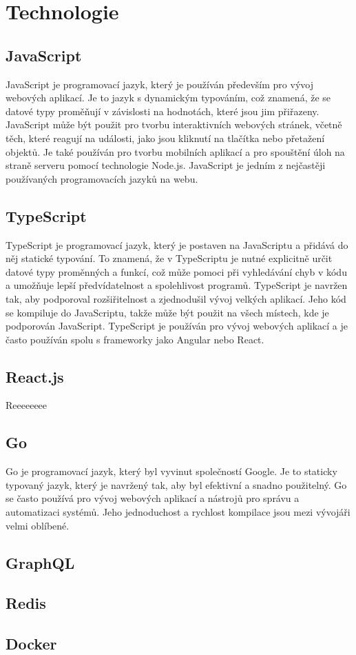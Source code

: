 \section{Technologie}

\subsection{JavaScript}

JavaScript je programovací jazyk, který je používán především pro vývoj webových aplikací. Je to jazyk s dynamickým typováním, což znamená, že se datové typy proměňují v závislosti na hodnotách, které jsou jim přiřazeny. JavaScript může být použit pro tvorbu interaktivních webových stránek, včetně těch, které reagují na události, jako jsou kliknutí na tlačítka nebo přetažení objektů. Je také používán pro tvorbu mobilních aplikací a pro spouštění úloh na straně serveru pomocí technologie Node.js. JavaScript je jedním z nejčastěji používaných programovacích jazyků na webu.

\subsection{TypeScript}
TypeScript je programovací jazyk, který je postaven na JavaScriptu a přidává do něj statické typování. To znamená, že v TypeScriptu je nutné explicitně určit datové typy proměnných a funkcí, což může pomoci při vyhledávání chyb v kódu a umožňuje lepší předvídatelnost a spolehlivost programů. TypeScript je navržen tak, aby podporoval rozšiřitelnost a zjednodušil vývoj velkých aplikací. Jeho kód se kompiluje do JavaScriptu, takže může být použit na všech místech, kde je podporován JavaScript. TypeScript je používán pro vývoj webových aplikací a je často používán spolu s frameworky jako Angular nebo React.
\subsection{React.js}
Reeeeeeee
\subsection{Go}
Go je programovací jazyk, který byl vyvinut společností Google. Je to staticky typovaný jazyk, který je navržený tak, aby byl efektivní a snadno použitelný. Go se často používá pro vývoj webových aplikací a nástrojů pro správu a automatizaci systémů. Jeho jednoduchost a rychlost kompilace jsou mezi vývojáři velmi oblíbené.

\subsection{GraphQL}

\subsection{Redis}

\subsection{Docker}